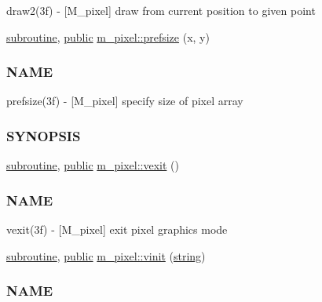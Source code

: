 \begin{DoxyCompactItemize}
\begin{DoxyCompactList}
draw2(3f) -\/ \mbox{[}M\+\_\+pixel\mbox{]} draw from current position to given point \end{DoxyCompactList}\item 
\hyperlink{M__stopwatch_83_8txt_acfbcff50169d691ff02d4a123ed70482}{subroutine}, \hyperlink{M__stopwatch_83_8txt_a2f74811300c361e53b430611a7d1769f}{public} \hyperlink{namespacem__pixel_acc868686f05b7e0b3cd33bf9d1c6bb98}{m\+\_\+pixel\+::prefsize} (x, y)
\begin{DoxyCompactList}\small\item\em \subsubsection*{N\+A\+ME}

prefsize(3f) -\/ \mbox{[}M\+\_\+pixel\mbox{]} specify size of pixel array \subsubsection*{S\+Y\+N\+O\+P\+S\+IS}\end{DoxyCompactList}\item 
\hyperlink{M__stopwatch_83_8txt_acfbcff50169d691ff02d4a123ed70482}{subroutine}, \hyperlink{M__stopwatch_83_8txt_a2f74811300c361e53b430611a7d1769f}{public} \hyperlink{namespacem__pixel_a19ad6b65752322b0029a62cc0ebec3e8}{m\+\_\+pixel\+::vexit} ()
\begin{DoxyCompactList}\small\item\em \subsubsection*{N\+A\+ME}

vexit(3f) -\/ \mbox{[}M\+\_\+pixel\mbox{]} exit pixel graphics mode \end{DoxyCompactList}\item 
\hyperlink{M__stopwatch_83_8txt_acfbcff50169d691ff02d4a123ed70482}{subroutine}, \hyperlink{M__stopwatch_83_8txt_a2f74811300c361e53b430611a7d1769f}{public} \hyperlink{namespacem__pixel_ac03ca8f23fdadb60599b6ea4dc87a6d9}{m\+\_\+pixel\+::vinit} (\hyperlink{what__overview_81_8txt_a74cb7e955273b9f9157b4f0c18a38849}{string})
\begin{DoxyCompactList}\small\item\em \subsubsection*{N\+A\+ME}


\end{DoxyCompactList}
\end{DoxyCompactItemize}
